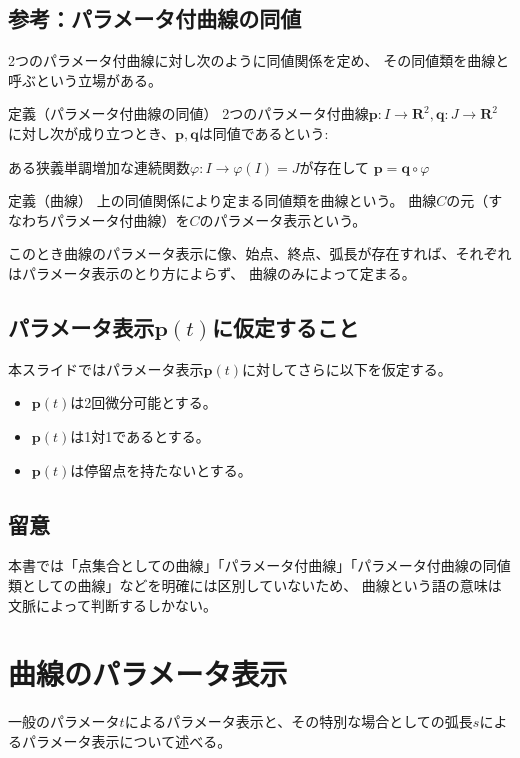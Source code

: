 \documentclass[a4j,disablejfam,dvipdfmx,papersize,slide,uplatex,21pt]{jsarticle}
\begin{document}
\newpage
\subsection*{参考：パラメータ付曲線の同値}
2つのパラメータ付曲線に対し次のように同値関係を定め、
その同値類を曲線と呼ぶという立場がある\cite{kaiseki1}。
\begin{itembox}[l]{定義（パラメータ付曲線の同値）}
    2つのパラメータ付曲線$\bm{p}: I \rightarrow \mathbf{R}^2, \bm{q}: J \rightarrow \mathbf{R}^2$
    に対し次が成り立つとき、$\bm{p}, \bm{q}$は同値であるという:
    \begin{center}
        ある狭義単調増加な連続関数$\varphi: I \rightarrow \varphi(I) = J$が存在して
        $\bm{p} = \bm{q} \circ \varphi$
    \end{center}
\end{itembox}

\begin{itembox}[l]{定義（曲線）}
    上の同値関係により定まる同値類を曲線という。
    曲線$C$の元（すなわちパラメータ付曲線）を$C$のパラメータ表示という。
\end{itembox}

このとき曲線のパラメータ表示に像、始点、終点、弧長が存在すれば、それぞれはパラメータ表示のとり方によらず、
曲線のみによって定まる。


\newpage
\subsection*{パラメータ表示$\bm{p}(t)$に仮定すること}
本スライドではパラメータ表示$\bm{p}(t)$に対してさらに以下を仮定する。
\begin{itemize}
    \item $\bm{p}(t)$は2回微分可能とする。
    \item $\bm{p}(t)$は1対1であるとする。
    \item $\bm{p}(t)$は停留点を持たないとする。
\end{itemize}

\newpage
\subsection*{留意}
本書では「点集合としての曲線」「パラメータ付曲線」「パラメータ付曲線の同値類としての曲線」などを明確には区別していないため、
曲線という語の意味は文脈によって判断するしかない。




\section{曲線のパラメータ表示}
一般のパラメータ$t$によるパラメータ表示と、その特別な場合としての弧長$s$によるパラメータ表示について述べる。
\end{document}
